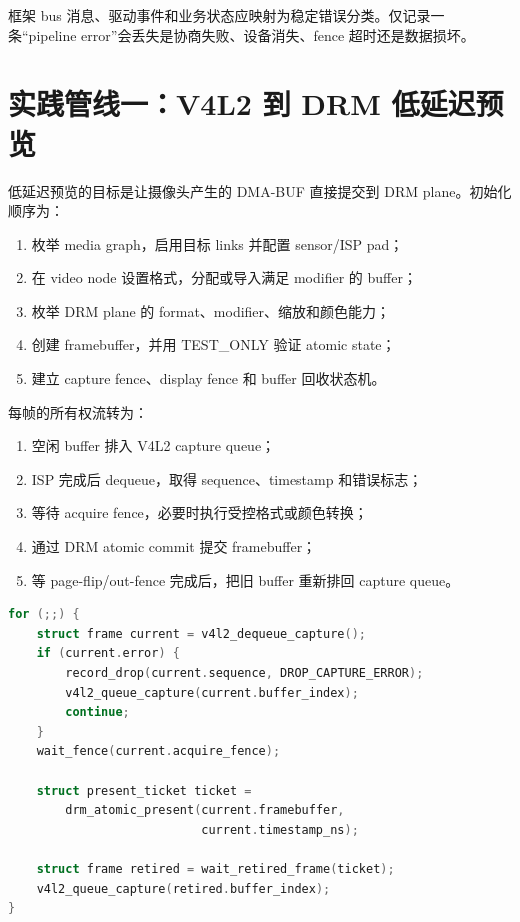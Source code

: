 框架 bus 消息、驱动事件和业务状态应映射为稳定错误分类。仅记录一条“pipeline error”会丢失是协商失败、设备消失、fence 超时还是数据损坏。

\section{实践管线一：V4L2 到 DRM 低延迟预览}

低延迟预览的目标是让摄像头产生的 DMA-BUF 直接提交到 DRM plane。初始化顺序为：

\begin{enumerate}
  \item 枚举 media graph，启用目标 links 并配置 sensor/ISP pad；
  \item 在 video node 设置格式，分配或导入满足 modifier 的 buffer；
  \item 枚举 DRM plane 的 format、modifier、缩放和颜色能力；
  \item 创建 framebuffer，并用 TEST\_ONLY 验证 atomic state；
  \item 建立 capture fence、display fence 和 buffer 回收状态机。
\end{enumerate}

每帧的所有权流转为：

\begin{enumerate}
  \item 空闲 buffer 排入 V4L2 capture queue；
  \item ISP 完成后 dequeue，取得 sequence、timestamp 和错误标志；
  \item 等待 acquire fence，必要时执行受控格式或颜色转换；
  \item 通过 DRM atomic commit 提交 framebuffer；
  \item 等 page-flip/out-fence 完成后，把旧 buffer 重新排回 capture queue。
\end{enumerate}

\noindent\begin{minipage}{\textwidth}
\begin{lstlisting}[language=C,caption={预览管线的有界主循环（伪代码）}]
for (;;) {
    struct frame current = v4l2_dequeue_capture();
    if (current.error) {
        record_drop(current.sequence, DROP_CAPTURE_ERROR);
        v4l2_queue_capture(current.buffer_index);
        continue;
    }
    wait_fence(current.acquire_fence);

    struct present_ticket ticket =
        drm_atomic_present(current.framebuffer,
                           current.timestamp_ns);

    struct frame retired = wait_retired_frame(ticket);
    v4l2_queue_capture(retired.buffer_index);
}
\end{lstlisting}
\end{minipage}

